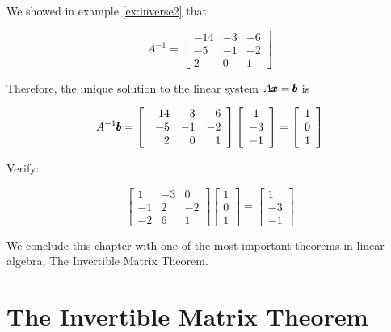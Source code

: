 \begin{solution} We showed in example \ref{ex:inverse2} that

    \[
    A^{-1}=\left[\begin{array}{rrr}
    -14 & -3 & -6 \\
    -5 & -1 & -2 \\
    2 & 0 & 1
    \end{array}\right]
    \]

Therefore, the unique solution to the linear system $A \pmb{x} = \pmb{b}$ is

    \[
    A^{-1} \pmb{b}=\left[\begin{array}{rrr}
    -14 & -3 & -6 \\
    -5 & -1 & -2 \\
    2 & 0 & 1
    \end{array}\right]\left[\begin{array}{c}
    1 \\
    -3 \\
    -1
    \end{array}\right]=\left[\begin{array}{l}
    1 \\
    0 \\
    1
    \end{array}\right]
    \]

Verify:

    \[
    \left[\begin{array}{rrr}
    1 & -3 & 0 \\
    -1 & 2 & -2 \\
    -2 & 6 & 1
    \end{array}\right]\left[\begin{array}{l}
    1 \\
    0 \\
    1
    \end{array}\right]=\left[\begin{array}{c}
    1 \\
    -3 \\
    -1
    \end{array}\right]
    \]
\end{solution}

We conclude this chapter with one of the most important theorems in linear algebra, The Invertible Matrix Theorem.

\section{The Invertible Matrix Theorem}

